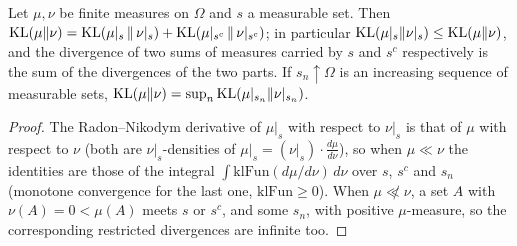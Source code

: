 \begin{lemma}\label{lem:kl_restrict}
\leanok
Let $\mu,\nu$ be finite measures on $\Omega$ and $s$ a measurable set. Then
$\mathrm{KL}(\mu\|\nu) = \mathrm{KL}(\mu|_s\,\|\,\nu|_s) + \mathrm{KL}(\mu|_{s^c}\,\|\,\nu|_{s^c})$; in particular
$\mathrm{KL}(\mu|_s\|\nu|_s) \le \mathrm{KL}(\mu\|\nu)$, and the divergence of two sums of measures carried by
$s$ and $s^c$ respectively is the sum of the divergences of the two parts. If $s_n \uparrow \Omega$
is an increasing sequence of measurable sets, $\mathrm{KL}(\mu\|\nu) = \sup_n \mathrm{KL}(\mu|_{s_n}\|\nu|_{s_n})$.
\end{lemma}

\begin{proof}
\leanok
The Radon--Nikodym derivative of $\mu|_s$ with respect to $\nu|_s$ is that of $\mu$ with respect
to $\nu$ (both are $\nu|_s$-densities of $\mu|_s = (\nu|_s)\cdot\frac{d\mu}{d\nu}$), so when
$\mu\ll\nu$ the identities are those of the integral $\int\mathrm{klFun}(d\mu/d\nu)\,d\nu$ over
$s$, $s^c$ and $s_n$ (monotone convergence for the last one, $\mathrm{klFun}\ge 0$). When
$\mu\not\ll\nu$, a set $A$ with $\nu(A) = 0 < \mu(A)$ meets $s$ or $s^c$, and some $s_n$, with
positive $\mu$-measure, so the corresponding restricted divergences are infinite too.
\end{proof}

